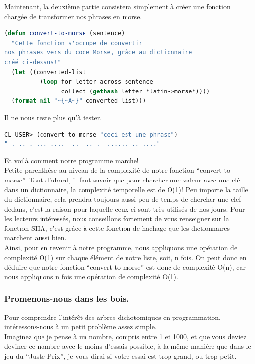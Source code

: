 \documentclass[a4paper, 12pt]{article}
\numberwithin{equation}{subsection}
\begin{document}
Maintenant, la deuxième partie consistera simplement à créer une fonction chargée de transformer nos phrases en morse. \\
\begin{lstlisting}[language=Lisp]
(defun convert-to-morse (sentence)
  "Cette fonction s'occupe de convertir
nos phrases vers du code Morse, grâce au dictionnaire
créé ci-dessus!"
  (let ((converted-list
          (loop for letter across sentence
                collect (gethash letter *latin->morse*))))
  (format nil "~{~A~}" converted-list)))
\end{lstlisting}
Il ne nous reste plus qu'à tester.
\begin{lstlisting}[language=Lisp]
CL-USER> (convert-to-morse "ceci est une phrase")
"_._.._._... ...._ ..__.. .__......_.._...."
\end{lstlisting}
Et voilà comment notre programme marche! \\

Petite parenthèse au niveau de la complexité de notre fonction ``convert to morse''. Tout d'abord, il faut savoir que pour chercher une valeur avec une clé dans un dictionnaire, la complexité temporelle est de O(1)! Peu importe la taille du dictionnaire, cela prendra toujours aussi peu de temps de chercher une clef dedans, c'est la raison pour laquelle ceux-ci sont très utilisés de nos jours.
Pour les lecteurs intéressés, nous conseillons fortement de vous renseigner sur la fonction SHA, c'est grâce à cette fonction de hachage que les dictionnaires marchent aussi bien. \\

Ainsi, pour en revenir à notre programme, nous appliquons une opération de complexité O(1) sur chaque élément de notre liste, soit, n fois. On peut donc en déduire que notre fonction ``convert-to-morse'' est donc de complexité O(n), car nous appliquons n fois une opération de complexité O(1). \\[0.2cm]
\subsubsection{Promenons-nous dans les bois.}
Pour comprendre l'intérêt des arbres dichotomiques en programmation, intéressons-nous à un petit problème assez simple. \\

Imaginez que je pense à un nombre, compris entre 1 et 1000, et que vous deviez deviner ce nombre avec le moins d'essais possible, à la même manière que dans le jeu du ``Juste Prix'', je vous dirai si votre essai est trop grand, ou trop petit. \\
\end{document}
